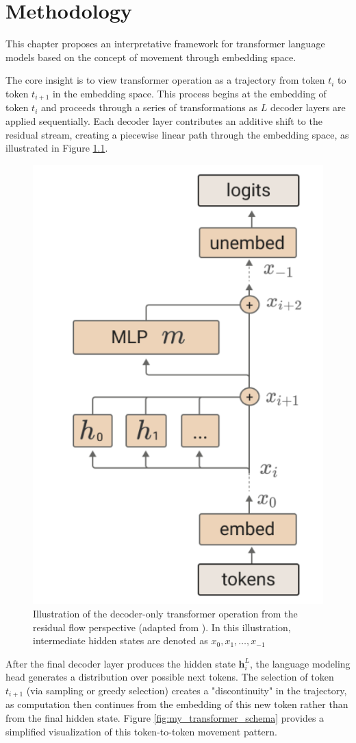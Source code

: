 \chapter{Methodology}

This chapter proposes an interpretative framework for transformer language models based on the concept of movement through embedding space.

The core insight is to view transformer operation as a trajectory from token $t_i$ to token $t_{i+1}$ in the embedding space. This process begins at the embedding of token $t_i$ and proceeds through a series of transformations as $L$ decoder layers are applied sequentially. Each decoder layer contributes an additive shift to the residual stream, creating a piecewise linear path through the embedding space, as illustrated in Figure \ref{fig:transformer_residual_sream}.

\begin{figure}[h]
    \centering
    \includegraphics[height=0.5\textwidth]{images/residual_stream.png}
    \caption{Illustration of the decoder-only transformer operation from the residual flow perspective (adapted from \cite{math_framework_transformer}). In this illustration, intermediate hidden states are denoted as $x_0, x_1, \dots, x_{-1}$}
    \label{fig:transformer_residual_sream}
\end{figure}

After the final decoder layer produces the hidden state $\mathbf{h}_i^L$, the language modeling head generates a distribution over possible next tokens. The selection of token $t_{i+1}$ (via sampling or greedy selection) creates a "discontinuity" in the trajectory, as computation then continues from the embedding of this new token rather than from the final hidden state. Figure \ref{fig:my_transformer_schema} provides a simplified visualization of this token-to-token movement pattern.

